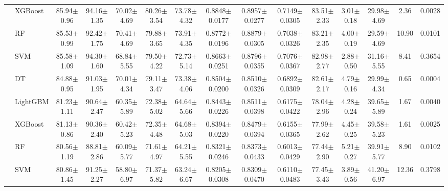 \begin{tabular}{@{}llccccccccccccc@{}}
 & XGBoost & 85.94{\tiny$\pm$0.96} & 94.16{\tiny$\pm$1.35} & 70.02{\tiny$\pm$4.69} & 80.26{\tiny$\pm$3.54} & 73.78{\tiny$\pm$4.32} & 0.8848{\tiny$\pm$0.0177} & 0.8957{\tiny$\pm$0.0277} & 0.7149{\tiny$\pm$0.0305} & 83.51{\tiny$\pm$2.33} & 3.01{\tiny$\pm$0.18} & 29.98{\tiny$\pm$4.69} & 2.36 & 0.0028\\
 & RF & 85.53{\tiny$\pm$0.99} & 92.42{\tiny$\pm$1.75} & 70.41{\tiny$\pm$4.69} & 79.88{\tiny$\pm$3.65} & 73.91{\tiny$\pm$4.35} & 0.8772{\tiny$\pm$0.0196} & 0.8879{\tiny$\pm$0.0305} & 0.7038{\tiny$\pm$0.0326} & 83.21{\tiny$\pm$2.35} & 4.00{\tiny$\pm$0.19} & 29.59{\tiny$\pm$4.69} & 10.90 & 0.0101\\
 & SVM & 85.58{\tiny$\pm$1.09} & 94.30{\tiny$\pm$1.60} & 68.84{\tiny$\pm$5.55} & 79.50{\tiny$\pm$4.22} & 72.73{\tiny$\pm$5.14} & 0.8663{\tiny$\pm$0.0251} & 0.8796{\tiny$\pm$0.0355} & 0.7076{\tiny$\pm$0.0367} & 82.98{\tiny$\pm$2.77} & 2.88{\tiny$\pm$0.50} & 31.16{\tiny$\pm$5.55} & 8.41 & 0.3654\\
 & DT & 84.88{\tiny$\pm$0.95} & 91.03{\tiny$\pm$1.95} & 70.01{\tiny$\pm$4.34} & 79.11{\tiny$\pm$3.47} & 73.38{\tiny$\pm$4.06} & 0.8504{\tiny$\pm$0.0200} & 0.8510{\tiny$\pm$0.0326} & 0.6892{\tiny$\pm$0.0309} & 82.61{\tiny$\pm$2.17} & 4.79{\tiny$\pm$0.16} & 29.99{\tiny$\pm$4.34} & 0.65 & 0.0004\\
\midrule
{} & LightGBM & 81.23{\tiny$\pm$1.11} & 90.64{\tiny$\pm$2.47} & 60.35{\tiny$\pm$5.89} & 72.38{\tiny$\pm$5.02} & 64.64{\tiny$\pm$5.66} & 0.8443{\tiny$\pm$0.0226} & 0.8511{\tiny$\pm$0.0398} & 0.6175{\tiny$\pm$0.0422} & 78.04{\tiny$\pm$2.96} & 4.28{\tiny$\pm$0.24} & 39.65{\tiny$\pm$5.89} & 1.67 & 0.0040\\
 & XGBoost & 81.13{\tiny$\pm$0.86} & 90.36{\tiny$\pm$2.40} & 60.42{\tiny$\pm$5.23} & 72.35{\tiny$\pm$4.48} & 64.68{\tiny$\pm$5.03} & 0.8394{\tiny$\pm$0.0220} & 0.8479{\tiny$\pm$0.0394} & 0.6155{\tiny$\pm$0.0365} & 77.99{\tiny$\pm$2.62} & 4.45{\tiny$\pm$0.25} & 39.58{\tiny$\pm$5.23} & 1.61 & 0.0025\\
 & RF & 80.56{\tiny$\pm$1.19} & 88.81{\tiny$\pm$2.86} & 60.09{\tiny$\pm$5.77} & 71.61{\tiny$\pm$4.97} & 64.21{\tiny$\pm$5.55} & 0.8321{\tiny$\pm$0.0246} & 0.8373{\tiny$\pm$0.0433} & 0.6013{\tiny$\pm$0.0429} & 77.44{\tiny$\pm$2.90} & 5.21{\tiny$\pm$0.27} & 39.91{\tiny$\pm$5.77} & 8.90 & 0.0102\\
 & SVM & 80.86{\tiny$\pm$1.45} & 91.25{\tiny$\pm$2.27} & 58.80{\tiny$\pm$6.97} & 71.37{\tiny$\pm$5.82} & 63.24{\tiny$\pm$6.67} & 0.8205{\tiny$\pm$0.0308} & 0.8309{\tiny$\pm$0.0470} & 0.6110{\tiny$\pm$0.0483} & 77.45{\tiny$\pm$3.43} & 3.89{\tiny$\pm$0.56} & 41.20{\tiny$\pm$6.97} & 12.36 & 0.3798\\

\end{tabular}
